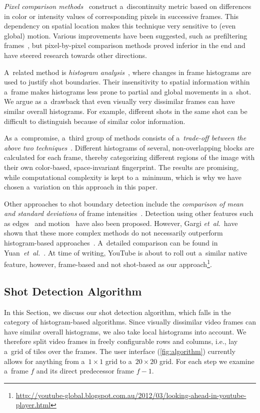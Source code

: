 \emph{Pixel comparison methods}~\cite{Hampapur1994, Zhang1993} construct a~discontinuity metric based on differences in color or intensity values of corresponding pixels in successive frames. This dependency on spatial location makes this technique very sensitive to (even global) motion. Various improvements have been suggested, such as prefiltering frames~\cite{Zhang1995}, but pixel-by-pixel comparison methods proved inferior in the end and have steered research towards other directions.

A~related method is \emph{histogram analysis}~\cite{Smeaton1999}, where changes in frame histograms are used to justify shot boundaries. Their insensitivity to spatial information within a~frame makes histograms less prone to partial and global movements in a~shot. We argue as a~drawback that even visually very dissimilar frames can have similar overall histograms. For example, different shots in the same shot can be difficult to distinguish because of similar color information.

As a~compromise, a~third group of methods consists of a~\emph{trade-off between the above two techniques}~\cite{Ahmed1999}. Different histograms of several, non-overlapping blocks are calculated for each frame, thereby categorizing different regions of the image with their own color-based, space-invariant fingerprint. The results are promising, while computational complexity is kept to a~minimum, which is why we have chosen a~variation on this approach in this paper.

Other approaches to shot boundary detection include the \emph{comparison of mean and standard deviations} of frame intensities~\cite{Lienhart1999}. Detection using other features such as edges~\cite{Zabih1995} and motion~\cite{Bouthemy1997} have also been proposed. However, Gargi \emph{et~al.}\ have shown that these more complex methods do not necessarily outperform histogram-based approaches~\cite{Gargi2000}. A~detailed comparison can be found in Yuan~\emph{et~al.}~\cite{Yuan2007}.
At time of writing, YouTube is about to roll out
a~similar native feature, however, frame-based and not shot-based as our approach\footnote{\url{http://youtube-global.blogspot.com.au/2012/03/looking-ahead-in-youtube-player.html}}.

\subsection{Shot Detection Algorithm} \label{sec:details-of-algo}
In this Section, we discuss our shot detection algorithm, which falls in the category of histogram-based algorithms.  Since visually dissimilar video frames can have similar overall histograms, we also take local histograms into account. 
We therefore split video frames in freely configurable rows and columns, i.e., lay a~grid of tiles over the frames. The user interface (\autoref{fig:algorithm}) currently allows for anything from a~$\mathit{1} \times \mathit{1}$ grid to a~$\mathit{20} \times \mathit{20}$ grid. For each step we examine a~frame $\mathit{f}$ and its direct predecessor frame $\mathit{f - 1}$.

